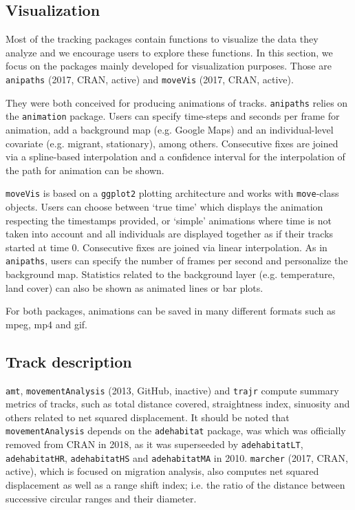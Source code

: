 \documentclass[a4paper,12pt]{article}
\newcommand{\Rpkg}[1]{\texttt{#1}}
\begin{document}
\subsection*{Visualization}

Most of the tracking packages contain functions to visualize the data they analyze and we encourage users to explore these functions. 
In this section, we focus on the packages mainly developed for visualization purposes. Those are \Rpkg{anipaths} (2017, CRAN, active) and \Rpkg{moveVis} (2017, CRAN, active). 

They were both conceived for producing animations of tracks. \Rpkg{anipaths} relies on the \Rpkg{animation} package. Users can specify time-steps and seconds per frame for animation, add a background map (e.g. Google Maps) and an individual-level covariate (e.g. migrant, stationary), among others. Consecutive fixes are joined via a spline-based interpolation and a confidence interval for the interpolation of the path for animation can be shown. 

\Rpkg{moveVis} is based on a \Rpkg{ggplot2} plotting architecture and works with \Rpkg{move}-class objects. Users can choose between `true time' which displays the animation respecting the timestamps provided, or `simple' animations where time is not taken into account and all individuals are displayed together as if their tracks started at time 0. Consecutive fixes are joined via linear interpolation. As in \Rpkg{anipaths}, users can specify the number of frames per second and personalize the background map. Statistics related to the background layer (e.g. temperature, land cover) can also be shown as animated lines or bar plots. 

For both packages, animations can be saved in many different formats such as mpeg, mp4 and gif. 

\subsection*{Track description}

\Rpkg{amt}, \Rpkg{movementAnalysis} (2013, GitHub, inactive) and \Rpkg{trajr} compute summary metrics of tracks, such as total distance covered, straightness index, sinuosity and others related to net squared displacement. It should be noted that \Rpkg{movementAnalysis} depends on the \Rpkg{adehabitat} package, was which was officially removed from CRAN in 2018, as it was superseeded by \Rpkg{adehabitatLT}, \Rpkg{adehabitatHR}, \Rpkg{adehabitatHS} and \Rpkg{adehabitatMA} in 2010. \Rpkg{marcher} (2017, CRAN, active), which is focused on migration analysis, also computes net squared displacement as well as a range shift index; i.e. the ratio of the distance between successive circular ranges and their diameter. 
\end{document}
